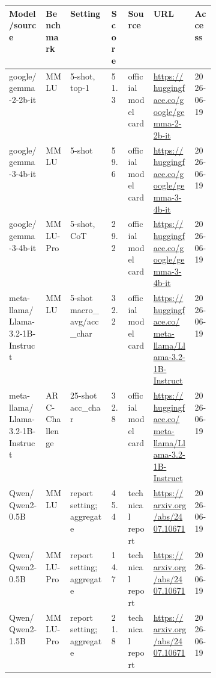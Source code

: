 \begin{tabular}{llp{0.20\linewidth}llp{0.20\linewidth}l}
\toprule
Model/source & Benchmark & Setting & Score & Source & URL & Access \\
\midrule
google/gemma-2-2b-it & MMLU & 5-shot, top-1 & 51.3 & official model card & \url{https://huggingface.co/google/gemma-2-2b-it} & 2026-06-19 \\
google/gemma-3-4b-it & MMLU & 5-shot & 59.6 & official model card & \url{https://huggingface.co/google/gemma-3-4b-it} & 2026-06-19 \\
google/gemma-3-4b-it & MMLU-Pro & 5-shot, CoT & 29.2 & official model card & \url{https://huggingface.co/google/gemma-3-4b-it} & 2026-06-19 \\
meta-llama/Llama-3.2-1B-Instruct & MMLU & 5-shot macro\_avg/acc\_char & 32.2 & official model card & \url{https://huggingface.co/meta-llama/Llama-3.2-1B-Instruct} & 2026-06-19 \\
meta-llama/Llama-3.2-1B-Instruct & ARC-Challenge & 25-shot acc\_char & 32.8 & official model card & \url{https://huggingface.co/meta-llama/Llama-3.2-1B-Instruct} & 2026-06-19 \\
Qwen/Qwen2-0.5B & MMLU & report setting; aggregate & 45.4 & technical report & \url{https://arxiv.org/abs/2407.10671} & 2026-06-19 \\
Qwen/Qwen2-0.5B & MMLU-Pro & report setting; aggregate & 14.7 & technical report & \url{https://arxiv.org/abs/2407.10671} & 2026-06-19 \\
Qwen/Qwen2-1.5B & MMLU-Pro & report setting; aggregate & 21.8 & technical report & \url{https://arxiv.org/abs/2407.10671} & 2026-06-19 \\
\bottomrule
\end{tabular}
